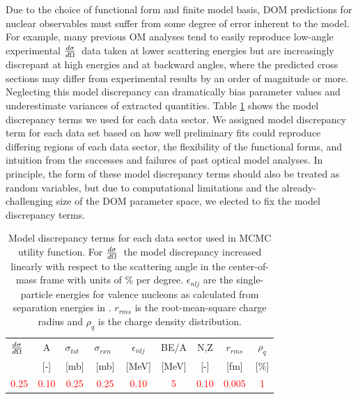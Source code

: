 \documentclass[twocolumn,secnumarabic,amssymb, nobibnotes, aps, prl,
superscriptaddress, nobalancelastpage, draft]{revtex4}
\newcommand{\tot}{\ensuremath{\sigma_{tot}}}
\newcommand{\rxn}{\ensuremath{\sigma_{rxn}}}
\newcommand{\el}{\ensuremath{\frac{\lowercase{d}\sigma}{\lowercase{d}\Omega}}}
\begin{document}
Due to the choice of functional form and finite model basis,
DOM predictions for nuclear observables must suffer from some degree of error
inherent to the model. For example, many previous
OM analyses tend to easily reproduce low-angle experimental \el\ data taken at
lower scattering energies but are increasingly discrepant at high energies
and at backward angles, where the predicted cross sections may
differ from experimental results by an order of magnitude or more. 
Neglecting this model discrepancy can
dramatically bias parameter values and underestimate variances of extracted
quantities. Table \ref{ModelDiscrepancyTable} shows the model discrepancy terms we used 
for each data sector. We assigned model discrepancy term for each data set
based on how well preliminary fits could reproduce differing regions of each
data sector, the flexibility of the functional forms, and intuition
from the successes and failures of past optical model analyses.
In principle, the form of these model discrepancy terms should also be treated as random
variables, but due to computational limitations and the already-challenging size
of the DOM parameter space, we elected to fix the model discrepancy terms.

\begin{table}[tb]
    \centering
    \begin{tabular}{ c c c c c c c c c}
        \el\ & A & \tot\ & \rxn\ & $\epsilon_{nlj}$ & BE/A & N,Z & $r_{rms}$ & $\rho_{q}$ \\ \relax
        [\%/$\degree$] & [-] & [mb] & [mb] & [MeV] & [MeV] & [-] & [fm] & [\%] \\
        \hline
        \textcolor{red}{0.25} & \textcolor{red}{0.10} & \textcolor{red}{0.25} &
        \textcolor{red}{0.25} & \textcolor{red}{0.10} & \textcolor{red}{5} &
        \textcolor{red}{0.10} & \textcolor{red}{0.005} & \textcolor{red}{1} \\
    \end{tabular}
    \caption{Model discrepancy terms for each data sector used in
        MCMC utility function. For \el\, the model discrepancy increased
        linearly with respect to the scattering angle in the
        center-of-mass frame with units of \% per degree. $\epsilon_{nlj}$
        are the single-particle energies for valence nucleons as calculated
        from separation energies in \cite{AME2016}.
        $r_{rms}$ is the root-mean-square charge radius and
        $\rho_{q}$ is the charge density distribution.}
    \label{ModelDiscrepancyTable}
\end{table}
\end{document}
